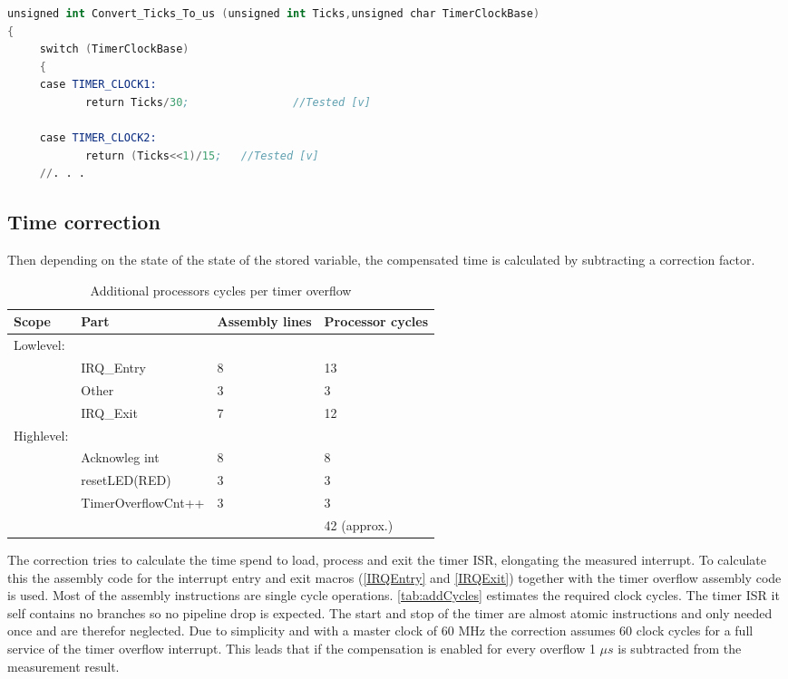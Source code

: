 \begin{lstlisting}[language=Assembler, caption={Extract Convert\_Ticks\_To\_us-function}, label={c2us}]
unsigned int Convert_Ticks_To_us (unsigned int Ticks,unsigned char TimerClockBase)
{ 
	 switch (TimerClockBase)
	 {
	 case TIMER_CLOCK1:
			return Ticks/30; 				//Tested [v]
		
	 case TIMER_CLOCK2:
			return (Ticks<<1)/15; 	//Tested [v]
	 //. . .
\end{lstlisting}

\subsection{Time correction}
\label{correction}
Then depending on the state of the state of the stored variable, the compensated time is calculated by subtracting a correction factor.\\ 

\begin{table}[H]
\begin{tabular}{llll} %
\textbf{Scope}	&\textbf{Part} &\textbf{Assembly lines}  &\textbf{Processor cycles} \\
\hline
\hline
Lowlevel:\\
\cline{1-1}
				& IRQ\_Entry 	&		8& 13\\
				&Other				&	3&3\\
				& IRQ\_Exit 	&7&12\\
Highlevel:\\
\cline{1-1}
				& Acknowleg int 	&		8& 8\\
				& resetLED(RED)				&	3&3\\
				& TimerOverflowCnt++ 	&3&3\\ \hhline{~~~=} 

&&&	42 (approx.)\\			
\end{tabular}
\caption{Additional processors cycles per timer overflow}
\label{tab:addCycles}
\end{table}

The correction tries to calculate the time spend to load, process and exit the timer {ISR}, elongating the measured interrupt. To calculate this the assembly code for the interrupt entry and exit macros (\autoref{IRQEntry} and \autoref{IRQExit}) together with the timer overflow assembly code is used. Most of the assembly instructions are single cycle operations. \autoref{tab:addCycles} estimates the required clock cycles. The timer \ac{ISR} it self contains no branches so no pipeline drop is expected. The start and stop of the timer are almost atomic instructions and only needed once and are therefor neglected. Due to simplicity and with a master clock of 60 MHz the correction assumes 60 clock cycles for a full service of the timer overflow interrupt. This leads that if the compensation is enabled for every overflow 1 $\mu s$ is subtracted from the measurement result.\\


